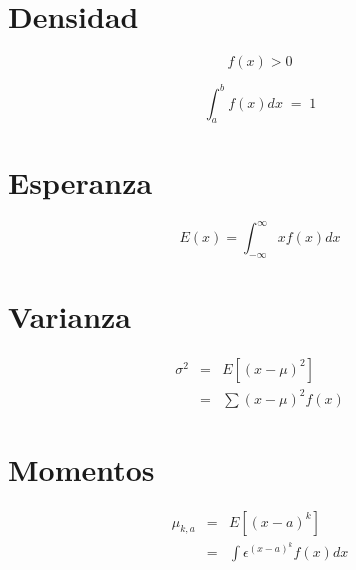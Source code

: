 \section{Densidad}

 \begin{minipage}[b]{\textwidth}
    \begin{minipage}[b]{0.5 \textwidth}
  
    \begin{equation*}
       f\left( x \right)>0
    \end{equation*}
    \end{minipage} \hfill 
    \begin{minipage}[b]{0.5 \textwidth}


    \begin{equation*}
        \int _{ a }^{ b }{ f\left( x \right)  } dx \;= \;1
    \end{equation*}

    \end{minipage}
    \end{minipage}
    
\begin{minipage}{\textwidth}
    \begin{minipage}[t]{0.5 \textwidth}
\section{Esperanza}  
    \begin{equation*}
       E(x)=\int _{ -\infty  }^{ \infty  }{ xf\left( x \right)  } dx
    \end{equation*}
    \end{minipage} \hfill 
    \begin{minipage}[t]{0.5 \textwidth}

\section{Varianza}
    \begin{eqnarray*}
 { \sigma  }^{ 2 } & = & E\left[ \left( x-\mu  \right) ^{ 2 } \right] \\
                   & = & \sum { \left( x-\mu \right) ^{2 } } f\left( x \right)
                   
\end{eqnarray*}

    \end{minipage}
    \end{minipage}
    
\section{Momentos}
    
    \begin{eqnarray*}
    \mu_{k,a}   & = & E\left[ \left( x-a \right) ^{ k } \right] \\
                & = & \int { \epsilon  } ^{(x-a)^k}f\left( x \right)dx
    \end{eqnarray*}
    